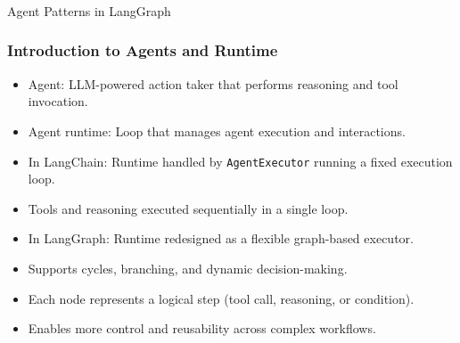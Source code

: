 \begin{frame}[fragile]\frametitle{}
\begin{center}
{\Large Agent Patterns in LangGraph}
\end{center}
\end{frame}
\begin{frame}[fragile]\frametitle{Introduction to Agents and Runtime}
      \begin{itemize}
        \item Agent: LLM-powered action taker that performs reasoning and tool invocation.
        \item Agent runtime: Loop that manages agent execution and interactions.
        \item In LangChain: Runtime handled by \texttt{AgentExecutor} running a fixed execution loop.
        \item Tools and reasoning executed sequentially in a single loop.
        \item In LangGraph: Runtime redesigned as a flexible graph-based executor.
        \item Supports cycles, branching, and dynamic decision-making.
        \item Each node represents a logical step (tool call, reasoning, or condition).
        \item Enables more control and reusability across complex workflows.
      \end{itemize}
\end{frame}
